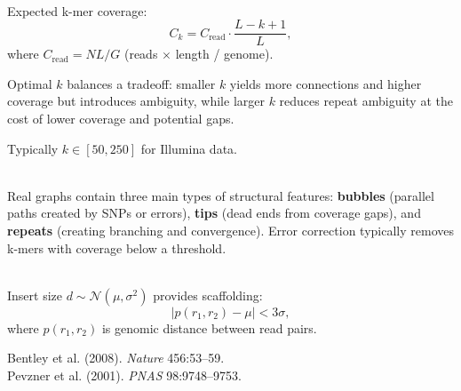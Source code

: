 \begin{technical}
\\[0.5em]
Expected k-mer coverage:
\[C_k = C_{\text{read}} \cdot \frac{L-k+1}{L},\]
where $C_{\text{read}} = NL/G$ (reads $\times$ length / genome).

Optimal $k$ balances a tradeoff: smaller $k$ yields more connections and higher coverage but introduces ambiguity, while larger $k$ reduces repeat ambiguity at the cost of lower coverage and potential gaps.

Typically $k \in [50, 250]$ for Illumina data.

\\[0.5em]
Real graphs contain three main types of structural features: \textbf{bubbles} (parallel paths created by SNPs or errors), \textbf{tips} (dead ends from coverage gaps), and \textbf{repeats} (creating branching and convergence). Error correction typically removes k-mers with coverage below a threshold.

\\[0.5em]
Insert size $d \sim \mathcal{N}(\mu, \sigma^2)$ provides scaffolding:
\[|p(r_1, r_2) - \mu| < 3\sigma,\]
where $p(r_1, r_2)$ is genomic distance between read pairs.

\techref
{\footnotesize
Bentley et al. (2008). \textit{Nature} 456:53–59.\\
Pevzner et al. (2001). \textit{PNAS} 98:9748–9753.
}
\end{technical}